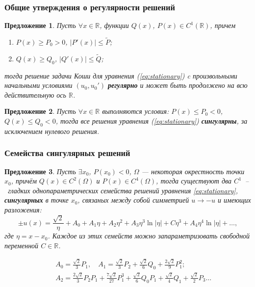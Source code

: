 \documentclass [10pt] {beamer}
\newtheorem{proposition}{Предложение}
\begin{document}
\begin{frame}
	\frametitle{Общие утверждения о регулярности решений}

	\begin{proposition}
		Пусть $\forall x \in \mathbb{R}$, функции $Q(x)$, $P(x) \in C^1(\mathbb{R})$, причем
		\begin{enumerate}
			\item[(а)] $P(x) \ge P_0 > 0$, $|P'(x)| \le \widetilde{P}$;
			\item[(б)] $Q(x) \ge Q_0$, $|Q'(x)| \le \widetilde{Q}$;
		\end{enumerate}
		тогда решение задачи Коши для уравнения (\ref{eq:stationary}) c произвольными начальными условиями $(u_0, u_0')$ {\bf регулярно} и может быть продолжено на всю действительную ось $\mathbb{R}$.
		\label{prop:regular}
	\end{proposition}

	\medskip
	
	\begin{proposition}
		Пусть $\forall x \in \mathbb{R}$ выполняются условия: $P(x) \le P_0 < 0$, $Q(x) \le Q_0 < 0$, тогда все решения уравнения (\ref{eq:stationary}) {\bf сингулярны}, за исключением нулевого решения.
		\label{prop:singular}
	\end{proposition}
	
\end{frame}

\begin{frame}
	\frametitle{Семейства сингулярных решений}

	\begin{proposition}
		Пусть $\exists x_0$, $P(x_0) < 0$, $\Omega$ --- некоторая окрестность точки $x_0$, причём $Q(x) \in C^2(\Omega)$ и $P(x) \in C^4(\Omega)$, тогда существуют два $C^1$~--~гладких однопараметрических семейства решений уравнения \eqref{eq:stationary}, {\bf сингулярных} в точке $x_0$, связаных между собой симметрией $u \to -u$ и имеющих разложения:
		\begin{equation}
			\pm u(x) = \frac{\sqrt{2}} \eta + A_0 + A_1 \eta + A_2 \eta^2 + A_3 \eta^3 \ln|\eta| + C \eta^3 + A_4 	\eta^4 \ln|\eta| + \ldots,
			\label{eq:series}
		\end{equation}
 		где $\eta = x - x_0$.
		Каждое из этих семейств можно запараметризовать свободной переменной $C \in \mathbb{R}$.
	\end{proposition}

	\begin{small}
		\begin{eqnarray*}	
			&& A_0 = \frac{\sqrt{2}}3P_1, \quad A_1 = \frac{\sqrt{2}} 3P_2 + \frac{\sqrt{2}} 6Q_0 + \frac{2\sqrt{2}} 9P_1^2; \\[2mm]
			&& A_2 = \frac{2\sqrt{2}} 3P_2 P_1 + \frac{7\sqrt{2}}{27} P_1^3 + \frac{\sqrt{2}} 6Q_0 P_1 + \frac{\sqrt{2}} 4Q_1 + \frac{\sqrt{2}} 2P_3 \dots
		\end{eqnarray*}
	\end{small}	
\end{frame}
\end{document}
